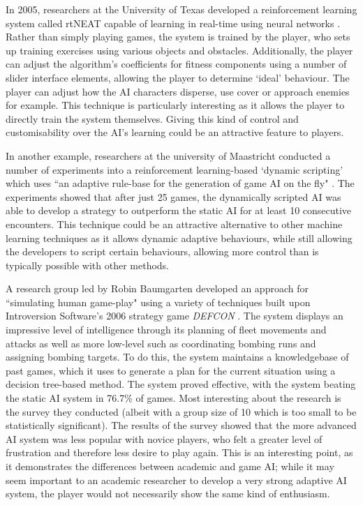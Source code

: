 \documentclass[a4paper,oneside]{report}
\begin{document}
In 2005, researchers at the University of Texas developed a reinforcement learning system called rtNEAT capable of learning in real-time using neural networks \cite{Stanley:2005ff}. Rather than simply playing games, the system is trained by the player, who sets up training exercises using various objects and obstacles. Additionally, the player can adjust the algorithm's coefficients for fitness components using a number of slider interface elements, allowing the player to determine `ideal' behaviour. The player can adjust how the AI characters disperse, use cover or approach enemies for example. This technique is particularly interesting as it allows the player to directly train the system themselves. Giving this kind of control and customisability over the AI's learning could be an attractive feature to players. 

In another example, researchers at the university of Maastricht conducted a number of experiments into a reinforcement learning-based `dynamic scripting' which uses ``an adaptive rule-base for the generation of game AI on the fly" \cite{Spronck:2005fu}. The experiments showed that after just 25 games, the dynamically scripted AI was able to develop a strategy to outperform the static AI for at least 10 consecutive encounters. This technique could be an attractive alternative to other machine learning techniques as it allows dynamic adaptive behaviours, while still allowing the developers to script certain behaviours, allowing more control than is typically possible with other methods.

A research group led by Robin Baumgarten developed an approach for ``simulating human game-play" using a variety of techniques built upon Introversion Software's 2006 strategy game \emph{DEFCON} \cite{Baumgarten:2008il}. The system displays an impressive level of intelligence through its planning of fleet movements and attacks as well as more low-level such as coordinating bombing runs and assigning bombing targets. To do this, the system maintains a knowledgebase of past games, which it uses to generate a plan for the current situation using a decision tree-based method. The system proved effective, with the system beating the static AI system in 76.7\% of games. Most interesting about the research is the survey they conducted (albeit with a group size of 10 which is too small to be statistically significant). The results of the survey showed that the more advanced AI system was less popular with novice players, who felt a greater level of frustration and therefore less desire to play again. This is an interesting point, as it demonstrates the differences between academic and game AI; while it may seem important to an academic researcher to develop a very strong adaptive AI system, the player would not necessarily show the same kind of enthusiasm.
\end{document}
